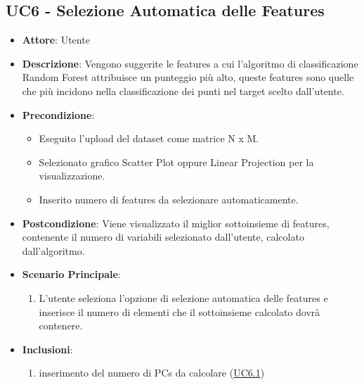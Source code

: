     \subsection{UC6 - Selezione Automatica delle Features}
    \begin{itemize}
    \item \textbf{Attore}: Utente
    \item \textbf{Descrizione}: Vengono suggerite le features a cui l'algoritmo di classificazione Random Forest attribuisce un punteggio più alto, queste features sono quelle che più incidono nella classificazione dei punti nel target scelto dall'utente.
    \item \textbf{Precondizione}: 
    \begin{itemize}
        \item Eseguito l'upload del dataset come matrice N x M.
        \item Selezionato grafico Scatter Plot oppure Linear Projection per la visualizzazione.
        \item Inserito numero di features da selezionare automaticamente.
    \end{itemize}
    \item \textbf{Postcondizione}: Viene visualizzato il miglior sottoinsieme di features, contenente il numero di variabili selezionato dall'utente, calcolato dall'algoritmo.
    \item \textbf{Scenario Principale}: 
    \begin{enumerate}
        \item L'utente seleziona l'opzione di selezione automatica delle features e inserisce il numero di elementi che il sottoinsieme calcolato dovrà contenere.
    \end{enumerate}
     \item \textbf{Inclusioni}:
        \begin{enumerate}
                \begin{enumerate}
                    \item inserimento del numero di PCs da calcolare (\hyperref[uc6.1]{UC6.1})
                \end{enumerate}
        \end{enumerate} 
    \end{itemize}
    
